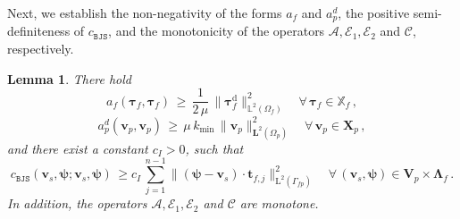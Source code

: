 \documentclass[11pt]{article}
\numberwithin{equation}{section}
\newcommand{\bLambda}{{\boldsymbol\Lambda}}
\newcommand{\bpsi}{{\boldsymbol\psi}}
\newcommand{\btau}{{\boldsymbol\tau}}
\newcommand{\bv}{{\mathbf{v}}}
\newcommand{\bt}{{\mathbf{t}}}
\newcommand{\0}{{\mathbf{0}}}
\def\bX{\mathbf{X}}
\def\bV{\mathbf{V}}
\newcommand{\bL}{\mathbf{L}}
\newcommand\bbX{\mathbb{X}}
\newcommand\bbL{\mathbb{L}}
\newcommand{\cA}{\mathcal{A}}
\newcommand{\cC}{\mathcal{C}}
\newcommand{\cE}{\mathcal{E}}
\def\L{\mathrm{L}}
\def\rd{\mathrm{d}}
\def\BJS{\mathtt{BJS}}
\newtheorem{lem}[thm]{Lemma}
\numberwithin{equation}{section}
\begin{document}
Next, we establish the non-negativity of the forms $a_f$ and $a^d_p$, the positive semi-definiteness of $c_\BJS$, and the monotonicity of the operators $\cA, \cE_1, \cE_2$ and $\cC$, respectively.
\begin{lem}\label{lem:coercivity-properties-A-E2}
There hold
\begin{equation}\label{eq:coercivity-af}
a_f(\btau_f, \btau_f) 
\,\geq\, \frac{1}{2\,\mu}\,\|\btau^\rd_f\|^2_{\bbL^2(\Omega_f)} \quad \forall\,\btau_f\in \bbX_f \,,
\end{equation}
%
\begin{equation}\label{eq:coercivity-adp}
a^d_p(\bv_p, \bv_p) 
\,\geq\, \mu\,k_{\min}\,\|\bv_p\|^2_{\bL^2(\Omega_p)} \quad \forall\, \bv_p\in \bX_p \,,
\end{equation}
and there exist a constant $c_I > 0$, such that
\begin{equation}\label{eq:positivity-aBJS}
c_\BJS(\bv_s,\bpsi;\bv_s,\bpsi) 
\,\geq c_I\,\sum^{n-1}_{j=1} \|( \bpsi-\bv_s)\cdot\bt_{f,j}\|^2_{\L^2(\Gamma_{fp})} \quad \forall\, (\bv_s, \bpsi)\in \bV_p\times \bLambda_f \,.
\end{equation}
In addition, the operators $\cA, \cE_1, \cE_2$ and $\cC$ are monotone. 
\end{lem}
%
\end{document}

